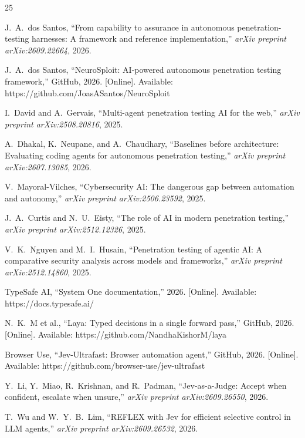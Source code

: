 \documentclass[conference]{IEEEtran}
\begin{document}
\begin{thebibliography}{25}

J.~A.~dos Santos, ``From capability to assurance in autonomous penetration-testing harnesses: A framework and reference implementation,'' \emph{arXiv preprint arXiv:2609.22664}, 2026.

J.~A.~dos Santos, ``NeuroSploit: AI-powered autonomous penetration testing framework,'' GitHub, 2026. [Online]. Available: https://github.com/JoasASantos/NeuroSploit

I.~David and A.~Gervais, ``Multi-agent penetration testing AI for the web,'' \emph{arXiv preprint arXiv:2508.20816}, 2025.

A.~Dhakal, K.~Neupane, and A.~Chaudhary, ``Baselines before architecture: Evaluating coding agents for autonomous penetration testing,'' \emph{arXiv preprint arXiv:2607.13085}, 2026.

V.~Mayoral-Vilches, ``Cybersecurity AI: The dangerous gap between automation and autonomy,'' \emph{arXiv preprint arXiv:2506.23592}, 2025.

J.~A.~Curtis and N.~U.~Eisty, ``The role of AI in modern penetration testing,'' \emph{arXiv preprint arXiv:2512.12326}, 2025.

V.~K.~Nguyen and M.~I.~Husain, ``Penetration testing of agentic AI: A comparative security analysis across models and frameworks,'' \emph{arXiv preprint arXiv:2512.14860}, 2025.

TypeSafe AI, ``System One documentation,'' 2026. [Online]. Available: https://docs.typesafe.ai/

N.~K.~M et al., ``Laya: Typed decisions in a single forward pass,'' GitHub, 2026. [Online]. Available: https://github.com/NandhaKishorM/laya

Browser Use, ``Jev-Ultrafast: Browser automation agent,'' GitHub, 2026. [Online]. Available: https://github.com/browser-use/jev-ultrafast

Y.~Li, Y.~Miao, R.~Krishnan, and R.~Padman, ``Jev-as-a-Judge: Accept when confident, escalate when unsure,'' \emph{arXiv preprint arXiv:2609.26550}, 2026.

T.~Wu and W.~Y.~B.~Lim, ``REFLEX with Jev for efficient selective control in LLM agents,'' \emph{arXiv preprint arXiv:2609.26532}, 2026.


\end{thebibliography}
\end{document}

